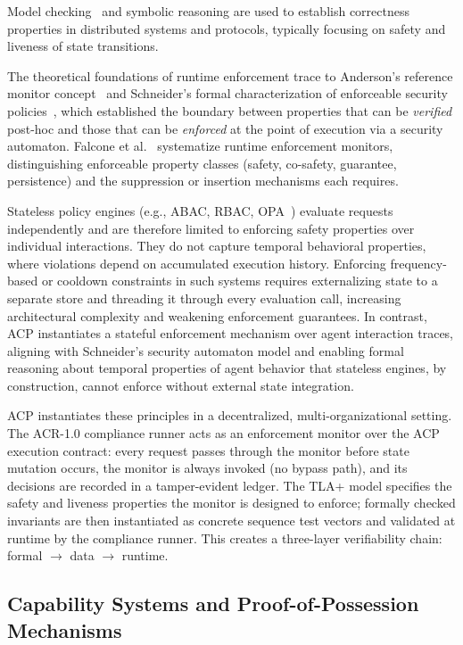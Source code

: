 \documentclass[11pt]{article}
\theoremstyle{definition}
\begin{document}
Model checking~\cite{lamport2002specifying} and symbolic reasoning are used to establish
correctness properties in distributed systems and protocols, typically focusing on safety
and liveness of state transitions.

The theoretical foundations of runtime enforcement trace to Anderson's reference monitor
concept~\cite{anderson1972planning} and Schneider's formal characterization of enforceable
security policies~\cite{schneider2000enforceable}, which established the boundary between
properties that can be \emph{verified} post-hoc and those that can be \emph{enforced}
at the point of execution via a security automaton.
Falcone et al.~\cite{falcone2012runtime} systematize runtime enforcement monitors,
distinguishing enforceable property classes (safety, co-safety, guarantee, persistence)
and the suppression or insertion mechanisms each requires.

Stateless policy engines (e.g., ABAC, RBAC, OPA~\cite{opa}) evaluate requests independently
and are therefore limited to enforcing safety properties over individual interactions.
They do not capture temporal behavioral properties, where violations depend on
accumulated execution history.
Enforcing frequency-based or cooldown constraints in such systems requires externalizing
state to a separate store and threading it through every evaluation call,
increasing architectural complexity and weakening enforcement guarantees.
In contrast, ACP instantiates a stateful enforcement mechanism over agent interaction
traces, aligning with Schneider's security automaton model and enabling formal reasoning
about temporal properties of agent behavior that stateless engines, by construction,
cannot enforce without external state integration.

ACP instantiates these principles in a decentralized, multi-organizational setting.
The ACR-1.0 compliance runner acts as an enforcement monitor over the ACP execution
contract: every request passes through the monitor before state mutation occurs,
the monitor is always invoked (no bypass path), and its decisions are recorded in a
tamper-evident ledger.
The TLA+ model specifies the safety and liveness properties the monitor is designed to
enforce; formally checked invariants are then instantiated as concrete sequence test
vectors and validated at runtime by the compliance runner.
This creates a three-layer verifiability chain: formal $\to$ data $\to$ runtime.

\subsection{Capability Systems and Proof-of-Possession Mechanisms}
\end{document}
